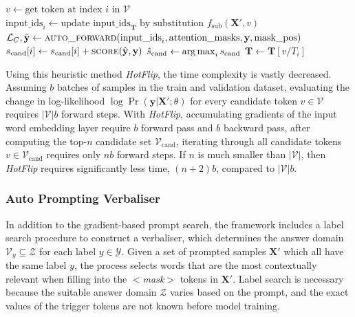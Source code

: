 \begin{algorithm}
\begin{algorithmic}[1]
    {\color{mylightgrey}}
        \State $v \gets \text{get token at index $i$ in $\mathcal{V}$}$
        {\color{mylightgrey}}
        \State $\text{input\_ids}_{i} \gets \text{update $\text{input\_ids}_{\textbf{T}}$ by substitution $f_\text{sub}(\textbf{X}', v)$}$
        \State $\mathcal{L}_C, \hat{\textbf{y}} \gets \Call{\text{auto\_forward}}{\text{input\_ids}_{i}, \text{attention\_masks}, \textbf{y}, \text{mask\_pos}}$
        \State $s_{\text{cand}}[i] \gets s_{\text{cand}}[i] + \Call{score}{\hat{\textbf{y}}, \textbf{y}}$
        {\color{mylightgrey}}
    \EndFor
    \State $\hat{s}_{\text{cand}} \gets \operatorname*{arg\,max}_{i} s_{\text{cand}}$ {\color{mylightgrey}}
        \State $\textbf{T} \gets \textbf{T}[v/T_i]$
        {\color{mylightgrey}}
    \EndIf
\EndFor
\EndFunction
\end{algorithmic}
\end{algorithm}

Using this heuristic method \textit{HotFlip}, the time complexity is vastly decreased. Assuming $b$ batches of samples in the train and validation dataset, evaluating the change in log-likelihood $\log\Pr(\textbf{y}| \textbf{X}' ; \theta)$ for every candidate token $v \in \mathcal{V}$ requires $|\mathcal{V}|b$ forward steps. With \textit{HotFlip}, accumulating gradients of the input word embedding layer require $b$ forward pass and $b$ backward pass, after computing the top-$n$ candidate set $\mathcal{V}_{\text{cand}}$, iterating through all candidate tokens $v \in \mathcal{V}_{\text{cand}}$ requires only $nb$ forward steps. If $n$ is much smaller than $|\mathcal{V}|$, then \textit{HotFlip} requires significantly less time, $(n+2)b$, compared to $|\mathcal{V}|b$.

\subsubsection{Auto Prompting Verbaliser} \label{sec:auto-verb}
In addition to the gradient-based prompt search, the framework includes a label search procedure to construct a verbaliser, which determines the answer domain $\mathcal{V}_{y} \subseteq \mathcal{Z}$ for each label $y \in \mathcal{Y}$. Given a set of prompted samples $\mathbf{X}'$ which all have the same label $y$, the process selects words that are the most contextually relevant when filling into the $<$\textit{mask}$>$ tokens in $\mathbf{X}'$. Label search is necessary because the suitable answer domain $\mathcal{Z}$ varies based on the prompt, and the exact values of the trigger tokens are not known before model training. 

